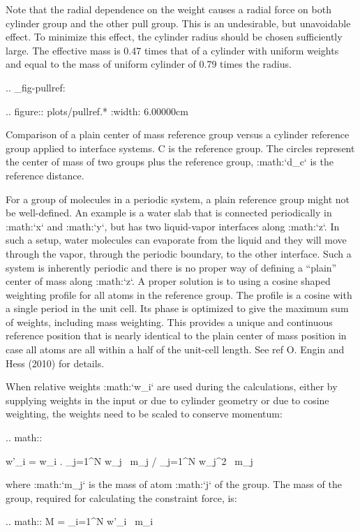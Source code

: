 Note that the radial dependence on the weight causes a radial force on
both cylinder group and the other pull group. This is an undesirable,
but unavoidable effect. To minimize this effect, the cylinder radius
should be chosen sufficiently large. The effective mass is 0.47 times
that of a cylinder with uniform weights and equal to the mass of uniform
cylinder of 0.79 times the radius.

.. _fig-pullref:

.. figure:: plots/pullref.*
   :width: 6.00000cm

   Comparison of a plain center of mass reference group versus a
   cylinder reference group applied to interface systems. C is the
   reference group. The circles represent the center of mass of two
   groups plus the reference group, :math:`d_c` is the reference
   distance.

For a group of molecules in a periodic system, a plain reference group
might not be well-defined. An example is a water slab that is connected
periodically in :math:`x` and :math:`y`, but has two liquid-vapor
interfaces along :math:`z`. In such a setup, water molecules can
evaporate from the liquid and they will move through the vapor, through
the periodic boundary, to the other interface. Such a system is
inherently periodic and there is no proper way of defining a “plain”
center of mass along :math:`z`. A proper solution is to using a cosine
shaped weighting profile for all atoms in the reference group. The
profile is a cosine with a single period in the unit cell. Its phase is
optimized to give the maximum sum of weights, including mass weighting.
This provides a unique and continuous reference position that is nearly
identical to the plain center of mass position in case all atoms are all
within a half of the unit-cell length. See ref O. Engin and Hess (2010)
for details.

When relative weights :math:`w_i` are used during the calculations,
either by supplying weights in the input or due to cylinder geometry or
due to cosine weighting, the weights need to be scaled to conserve
momentum:

.. math::

   w'_i = w_i
   \left. \sum_{j=1}^N w_j \, m_j \right/ \sum_{j=1}^N w_j^2 \, m_j

where :math:`m_j` is the mass of atom :math:`j` of the group. The mass
of the group, required for calculating the constraint force, is:

.. math:: M = \sum_{i=1}^N w'_i \, m_i

